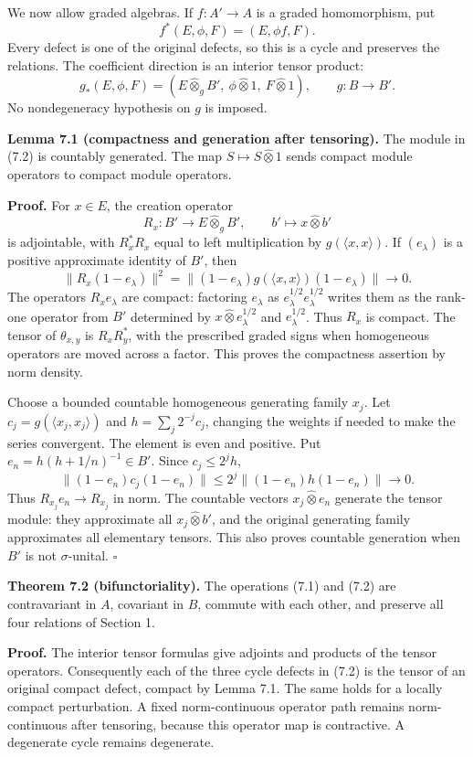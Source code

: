\documentclass[
  11pt,
]{article}
\begin{document}
We now allow graded algebras. If \(f:A'\to A\) is a graded homomorphism,
put \[
f^*(E,\phi,F)=(E,\phi f,F).
\tag{7.1}
\] Every defect is one of the original defects, so this is a cycle and
preserves the relations. The coefficient direction is an interior tensor
product: \[
g_*(E,\phi,F)
=(E\widehat\otimes_g B',\ \phi\widehat\otimes1,\
F\widehat\otimes1),\qquad g:B\to B'.
\tag{7.2}
\] No nondegeneracy hypothesis on \(g\) is imposed.

\textbf{Lemma 7.1 (compactness and generation after tensoring).} The
module in (7.2) is countably generated. The map
\(S\mapsto S\widehat\otimes1\) sends compact module operators to compact
module operators.

\textbf{Proof.} For \(x\in E\), the creation operator \[
R_x:B'\longrightarrow E\widehat\otimes_g B',
\qquad b'\longmapsto x\widehat\otimes b'
\] is adjointable, with \(R_x^*R_x\) equal to left multiplication by
\(g(\langle x,x\rangle)\). If \((e_\lambda)\) is a positive approximate
identity of \(B'\), then \[
\|R_x(1-e_\lambda)\|^2
=\|(1-e_\lambda)g(\langle x,x\rangle)(1-e_\lambda)\|
\longrightarrow0.
\tag{7.3}
\] The operators \(R_x e_\lambda\) are compact: factoring \(e_\lambda\)
as \(e_\lambda^{1/2}e_\lambda^{1/2}\) writes them as the rank-one
operator from \(B'\) determined by \(x\widehat\otimes e_\lambda^{1/2}\)
and \(e_\lambda^{1/2}\). Thus \(R_x\) is compact. The tensor of
\(\theta_{x,y}\) is \(R_xR_y^*\), with the prescribed graded signs when
homogeneous operators are moved across a factor. This proves the
compactness assertion by norm density.

Choose a bounded countable homogeneous generating family \(x_j\). Let
\(c_j=g(\langle x_j,x_j\rangle)\) and \(h=\sum_j2^{-j}c_j\), changing
the weights if needed to make the series convergent. The element is even
and positive. Put \(e_n=h(h+1/n)^{-1}\in B'\). Since \(c_j\leq2^j h\),
\[
\|(1-e_n)c_j(1-e_n)\|
\leq2^j\|(1-e_n)h(1-e_n)\|\longrightarrow0.
\tag{7.4}
\] Thus \(R_{x_j}e_n\to R_{x_j}\) in norm. The countable vectors
\(x_j\widehat\otimes e_n\) generate the tensor module: they approximate
all \(x_j\widehat\otimes b'\), and the original generating family
approximates all elementary tensors. This also proves countable
generation when \(B'\) is not \(\sigma\)-unital. \(\square\)

\textbf{Theorem 7.2 (bifunctoriality).} The operations (7.1) and (7.2)
are contravariant in \(A\), covariant in \(B\), commute with each other,
and preserve all four relations of Section 1.

\textbf{Proof.} The interior tensor formulas give adjoints and products
of the tensor operators. Consequently each of the three cycle defects in
(7.2) is the tensor of an original compact defect, compact by Lemma 7.1.
The same holds for a locally compact perturbation. A fixed
norm-continuous operator path remains norm-continuous after tensoring,
because this operator map is contractive. A degenerate cycle remains
degenerate.
\end{document}
